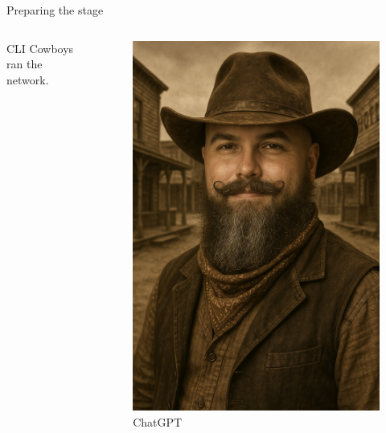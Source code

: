 \documentclass[aspectratio=169]{beamer}
\begin{document}
\begin{frame}{Preparing the stage}

  \begin{columns}
    \begin{column}{0.4\textwidth}
      CLI Cowboys ran the network.
    \end{column}
    \begin{column}{0.4\textwidth}
      \begin{figure}
        \includegraphics[height = 0.7\textheight]{images/urs_cowboy.png}
        \caption{\footnotesize ChatGPT}
      \end{figure}
    \end{column}
  \end{columns}

\end{frame}
\end{document}
